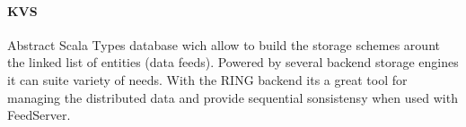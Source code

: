\paragraph{KVS}
Abstract Scala Types database wich allow to build the storage schemes arount the linked list of entities (data feeds).
Powered by several backend storage engines it can suite variety of needs.
With the RING backend its a great tool for managing the distributed data and provide sequential sonsistensy when used with FeedServer.
